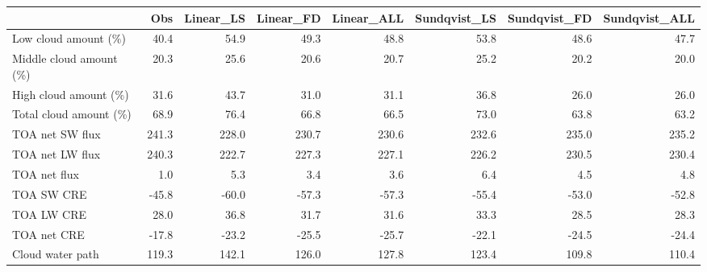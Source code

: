 \begin{tabular}{lrrrrrrr}
\toprule
{} &   Obs &  Linear\_LS &  Linear\_FD &  Linear\_ALL &  Sundqvist\_LS &  Sundqvist\_FD &  Sundqvist\_ALL \\
\midrule
Low cloud amount (\%)    &  40.4 &       54.9 &       49.3 &        48.8 &          53.8 &          48.6 &           47.7 \\
Middle cloud amount (\%) &  20.3 &       25.6 &       20.6 &        20.7 &          25.2 &          20.2 &           20.0 \\
High cloud amount (\%)   &  31.6 &       43.7 &       31.0 &        31.1 &          36.8 &          26.0 &           26.0 \\
Total cloud amount (\%)  &  68.9 &       76.4 &       66.8 &        66.5 &          73.0 &          63.8 &           63.2 \\
TOA net SW flux         & 241.3 &      228.0 &      230.7 &       230.6 &         232.6 &         235.0 &          235.2 \\
TOA net LW flux         & 240.3 &      222.7 &      227.3 &       227.1 &         226.2 &         230.5 &          230.4 \\
TOA net flux            &   1.0 &        5.3 &        3.4 &         3.6 &           6.4 &           4.5 &            4.8 \\
TOA SW CRE              & -45.8 &      -60.0 &      -57.3 &       -57.3 &         -55.4 &         -53.0 &          -52.8 \\
TOA LW CRE              &  28.0 &       36.8 &       31.7 &        31.6 &          33.3 &          28.5 &           28.3 \\
TOA net CRE             & -17.8 &      -23.2 &      -25.5 &       -25.7 &         -22.1 &         -24.5 &          -24.4 \\
Cloud water path        & 119.3 &      142.1 &      126.0 &       127.8 &         123.4 &         109.8 &          110.4 \\
\bottomrule
\end{tabular}
